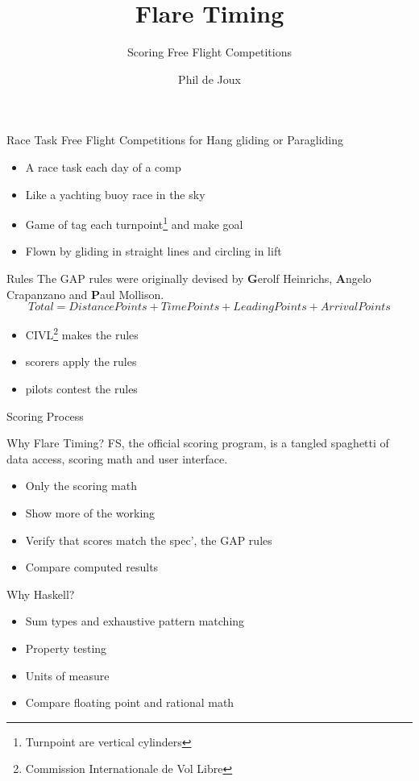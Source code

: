 \documentclass{beamer}
\title{Flare Timing}
\subtitle{Scoring Free Flight Competitions}
\author{Phil de Joux}
\institute{Block Scope}
\date{}
\begin{document}
\begin{frame}
\titlepage
\end{frame}

\begin{frame}{Race Task}
    Free Flight Competitions for Hang gliding or Paragliding
\begin{itemize}
    \item A race task each day of a comp
    \item Like a yachting buoy race in the sky
    \item Game of tag each turnpoint\footnote{Turnpoint are vertical cylinders} and make goal
    \item Flown by gliding in straight lines and circling in lift
\end{itemize}
\end{frame}


\begin{frame}{Rules}
The GAP rules were originally devised by \textbf{G}erolf Heinrichs, \textbf{A}ngelo Crapanzano and \textbf{P}aul Mollison.
\[ Total = DistancePoints + TimePoints + LeadingPoints + ArrivalPoints \]
    
\begin{itemize}
    \item CIVL\footnote{Commission Internationale de Vol Libre} makes the rules
    \item scorers apply the rules
    \item pilots contest the rules
\end{itemize}
\end{frame}

\begin{frame}{Scoring Process}
\begin{figure}[!ht]
    \centering
    
    \label{fig:scoring-process}
\end{figure}
\end{frame}

\begin{frame}{Why Flare Timing?}
FS, the official scoring program, is a tangled spaghetti of data access, scoring math and user interface.
\begin{itemize}
    \item Only the scoring math
    \item Show more of the working
    \item Verify that scores match the spec', the GAP rules
    \item Compare computed results
\end{itemize}
\end{frame}

\begin{frame}{Why Haskell?}
\begin{itemize}
    \item Sum types and exhaustive pattern matching
    \item Property testing
    \item Units of measure
    \item Compare floating point and rational math
\end{itemize}
\end{frame}
\end{document}
